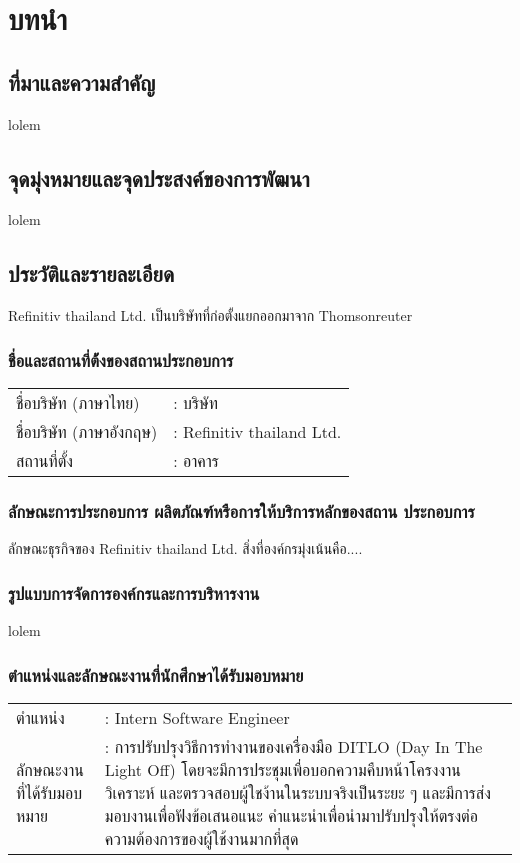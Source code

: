 \chapter{บทนำ}
\label{chapter:introduction}

\section{ที่มาและความสำคัญ}

lolem

\section{จุดมุ่งหมายและจุดประสงค์ของการพัฒนา}

lolem

\section{ประวัติและรายละเอียด}
Refinitiv thailand Ltd. เป็นบริษัทที่ก่อตั้งแยกออกมาจาก Thomsonreuter 
\subsection{ชื่อและสถานที่ต้้งของสถานประกอบการ}
\begin{table}[h]
    \begin{tabular}{ll}
    ชื่อบริษัท (ภาษาไทย) & : บริษัท  \\
    ชื่อบริษัท (ภาษาอังกฤษ) & : Refinitiv thailand Ltd. \\
    สถานที่ตั้ง  & : อาคาร \\
    \end{tabular}
\end{table}

\subsection{ลักษณะการประกอบการ ผลิตภัณฑ์หรือการให้บริการหลักของสถาน ประกอบการ}
ลักษณะธุรกิจของ Refinitiv thailand Ltd. สิ่งที่องค์กรมุ่งเน้นคือ....
\subsection{รูปแบบการจัดการองค์กรและการบริหารงาน}
lolem

\subsection{ตำแหน่งและลักษณะงานที่นักศึกษาได้รับมอบหมาย}
\begin{table}[h]
    \begin{tabular}{ll}
    ตำแหน่ง & : Intern Software Engineer \\
    ลักษณะงานที่ได้รับมอบหมาย   & : การปรับปรุงวิธีการทำงานของเครื่องมือ DITLO (Day In The Light Off)  
    โดยจะมีการประชุมเพื่อบอกความคืบหน้าโครงงาน วิเคราะห์ และตรวจสอบผู้ใชง้านในระบบจริงเป็นระยะ ๆ และมีการส่งมอบงานเพื่อฟังข้อเสนอแนะ คำแนะนำเพื่อนำมาปรับปรุงให้ตรงต่อความต้องการของผู้ใช้งานมากที่สุด
    \end{tabular}
\end{table}

